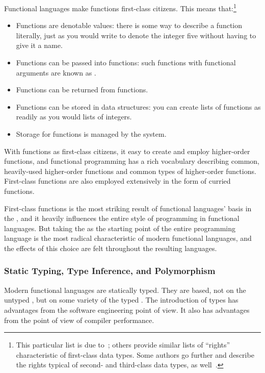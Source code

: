 Functional languages make functions first-class citizens. This means that:\footnote{This particular list is due to~\citet{Mody:Functional:1992}; others provide similar lists of ``rights'' characteristic of first-class data types. Some authors go further and describe the rights typical of second- and third-class data types, as well~\citep[for example][\S 3.5.2]{Scott:Programming:2006}.}
\begin{itemize}
\item
Functions are denotable values: there is some way to describe a function literally, just as you would write  to denote the integer five without having to give it a name.

\item
Functions can be passed into functions: such functions with functional arguments are known as .

\item
Functions can be returned from functions.

\item
Functions can be stored in data structures: you can create lists of functions as readily as you would lists of integers.

\item
Storage for functions is managed by the system.
\end{itemize}
With functions as first-class citizens, it easy to create and employ higher-order functions, and functional programming has a rich vocabulary describing common, heavily-used higher-order functions and common types of higher-order functions. First-class functions are also employed extensively in the form of curried functions.

First-class functions is the most striking result of functional languages' basis in the \lambdacalc{}, and it heavily influences the entire style of programming in functional languages. But taking the \lambdacalc as the starting point of the entire programming language is the most radical characteristic of modern functional languages, and the effects of this choice are felt throughout the resulting languages.

\subsubsection[Static Typing, Type Inference, Polymorphism]{Static Typing, Type Inference, and Polymorphism}
Modern functional languages are statically typed. They are based, not on the untyped \lambdacalc{}, but on some variety of the typed \lambdacalc{}. The introduction of types has advantages from the software engineering point of view. It also has advantages from the point of view of compiler performance.

